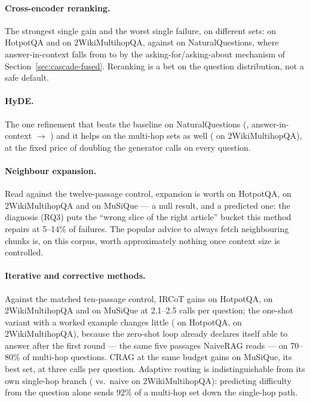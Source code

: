 \paragraph{Cross-encoder reranking.} The strongest single gain and the
worst single failure, on different sets: \NaiveVsRerankHotpotQAExactMatchDiff{}
on HotpotQA and \NaiveVsRerankTwoWikiExactMatchDiff{} on 2WikiMultihopQA,
against \NaiveVsRerankNQExactMatchDiff{} on NaturalQuestions, where
answer-in-context falls from \NaiveRAGNQAnswerInContext{} to
\RerankNQAnswerInContext{} by the asking-for/asking-about mechanism of
Section~\ref{sec:cascade-fused}. Reranking is a bet on the question
distribution, not a safe default.

\paragraph{HyDE.} The one refinement that beats the baseline on
NaturalQuestions (\NaiveVsHyDENQExactMatchDiff{}, answer-in-context
\NaiveRAGNQAnswerInContext{} $\rightarrow$ \HyDENQAnswerInContext) and it
helps on the multi-hop sets as well
(\NaiveVsHyDETwoWikiExactMatchDiff{} on 2WikiMultihopQA), at the fixed
price of doubling the generator calls on every question.

\paragraph{Neighbour expansion.} Read against the twelve-passage control,
expansion is worth \NaiveTwelveVsNeighbourHotpotQAExactMatchDiff{} on
HotpotQA, \NaiveTwelveVsNeighbourTwoWikiExactMatchDiff{} on
2WikiMultihopQA and \NaiveTwelveVsNeighbourMuSiQueExactMatchDiff{} on
MuSiQue --- a null result, and a predicted one: the diagnosis
(RQ3) puts the ``wrong slice of the right article'' bucket this method
repairs at 5--14\% of failures. The popular advice to always fetch
neighbouring chunks is, on this corpus, worth approximately nothing once
context size is controlled.

\paragraph{Iterative and corrective methods.} Against the matched
ten-passage control, IRCoT gains
\NaiveTenVsIRCoTHotpotQAExactMatchDiff{} on HotpotQA,
\NaiveTenVsIRCoTTwoWikiExactMatchDiff{} on 2WikiMultihopQA and
\NaiveTenVsIRCoTMuSiQueExactMatchDiff{} on MuSiQue at 2.1--2.5 calls per
question; the one-shot variant with a worked example changes little
(\IRCoTVsIRCoTOneShotHotpotQAExactMatchDiff{} on HotpotQA,
\IRCoTVsIRCoTOneShotTwoWikiExactMatchDiff{} on 2WikiMultihopQA), because
the zero-shot loop already declares itself able to answer after the first
round --- the same five passages NaiveRAG reads --- on 70--80\% of
multi-hop questions. CRAG at the same budget gains
\NaiveTenVsCRAGTenMuSiQueExactMatchDiff{} on MuSiQue, its best set, at
three calls per question. Adaptive routing is indistinguishable from its
own single-hop branch (\NaiveVsAdaptiveTwoWikiExactMatchDiff{} vs.\ naive
on 2WikiMultihopQA): predicting difficulty from the question alone sends
92\% of a multi-hop set down the single-hop path.


